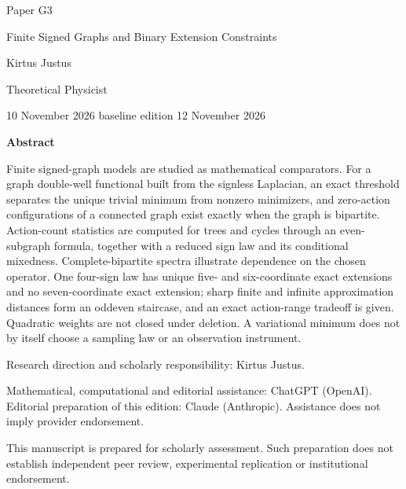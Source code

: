 \documentclass[11pt,a4paper]{article}
\begin{document}
\begin{titlepage}
{\small\sffamily \ProgramTitle\hfill Paper G3\par}
\vspace*{16mm}
{\LARGE\bfseries\raggedright{} Finite Signed Graphs and Binary Extension Constraints\par}
\vspace{11mm}
{\large Kirtus Justus\par}
\vspace{1mm}
Theoretical Physicist\par
\AuthorLocation\par
\vspace{2mm}
10 November 2026 \textperiodcentered{} baseline edition 12 November 2026\par
\vspace{11mm}
\textbf{Abstract}\par
Finite signed-graph models are studied as mathematical comparators. For a graph double-well functional built from the signless Laplacian, an exact threshold separates the unique trivial minimum from nonzero minimizers, and zero-action configurations of a connected graph exist exactly when the graph is bipartite. Action-count statistics are computed for trees and cycles through an even-subgraph formula, together with a reduced sign law and its conditional mixedness. Complete-bipartite spectra illustrate dependence on the chosen operator. One four-sign law has unique five- and six-coordinate exact extensions and no seven-coordinate exact extension; sharp finite and infinite approximation distances form an odd\textendash even staircase, and an exact action-range tradeoff is given. Quadratic weights are not closed under deletion. A variational minimum does not by itself choose a sampling law or an observation instrument.\par
\vfill
{\small Research direction and scholarly responsibility: Kirtus Justus.\par
Mathematical, computational and editorial assistance: ChatGPT (OpenAI). Editorial preparation of this edition: Claude (Anthropic).
Assistance does not imply provider endorsement.\par
This manuscript is prepared for scholarly assessment. Such preparation does not establish independent peer review,
experimental replication or institutional endorsement.\par}
\end{titlepage}
\setcounter{page}{2}
\setcounter{section}{1}

\clearpage
\end{document}
